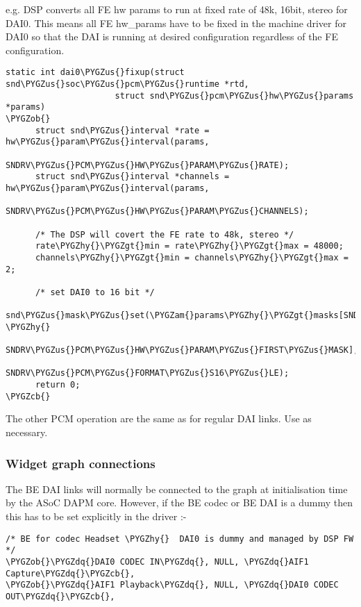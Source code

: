 \documentclass[a4paper,8pt,english]{sphinxmanual}
\def\PYGZus{\char`\_}
\def\PYGZob{\char`\{}
\def\PYGZcb{\char`\}}
\def\PYGZam{\char`\&}
\def\PYGZgt{\char`\>}
\def\PYGZhy{\char`\-}
\def\PYGZdq{\char`\"}
\begin{document}
e.g. DSP converts all FE hw params to run at fixed rate of 48k, 16bit, stereo for
DAI0. This means all FE hw\_params have to be fixed in the machine driver for
DAI0 so that the DAI is running at desired configuration regardless of the FE
configuration.

\begin{Verbatim}[commandchars=\\\{\}]
static int dai0\PYGZus{}fixup(struct snd\PYGZus{}soc\PYGZus{}pcm\PYGZus{}runtime *rtd,
                      struct snd\PYGZus{}pcm\PYGZus{}hw\PYGZus{}params *params)
\PYGZob{}
      struct snd\PYGZus{}interval *rate = hw\PYGZus{}param\PYGZus{}interval(params,
                      SNDRV\PYGZus{}PCM\PYGZus{}HW\PYGZus{}PARAM\PYGZus{}RATE);
      struct snd\PYGZus{}interval *channels = hw\PYGZus{}param\PYGZus{}interval(params,
                                              SNDRV\PYGZus{}PCM\PYGZus{}HW\PYGZus{}PARAM\PYGZus{}CHANNELS);

      /* The DSP will covert the FE rate to 48k, stereo */
      rate\PYGZhy{}\PYGZgt{}min = rate\PYGZhy{}\PYGZgt{}max = 48000;
      channels\PYGZhy{}\PYGZgt{}min = channels\PYGZhy{}\PYGZgt{}max = 2;

      /* set DAI0 to 16 bit */
      snd\PYGZus{}mask\PYGZus{}set(\PYGZam{}params\PYGZhy{}\PYGZgt{}masks[SNDRV\PYGZus{}PCM\PYGZus{}HW\PYGZus{}PARAM\PYGZus{}FORMAT \PYGZhy{}
                                  SNDRV\PYGZus{}PCM\PYGZus{}HW\PYGZus{}PARAM\PYGZus{}FIRST\PYGZus{}MASK],
                                  SNDRV\PYGZus{}PCM\PYGZus{}FORMAT\PYGZus{}S16\PYGZus{}LE);
      return 0;
\PYGZcb{}
\end{Verbatim}

The other PCM operation are the same as for regular DAI links. Use as necessary.


\subsubsection{Widget graph connections}
\label{sound/soc/dpcm:widget-graph-connections}
The BE DAI links will normally be connected to the graph at initialisation time
by the ASoC DAPM core. However, if the BE codec or BE DAI is a dummy then this
has to be set explicitly in the driver :-

\begin{Verbatim}[commandchars=\\\{\}]
/* BE for codec Headset \PYGZhy{}  DAI0 is dummy and managed by DSP FW */
\PYGZob{}\PYGZdq{}DAI0 CODEC IN\PYGZdq{}, NULL, \PYGZdq{}AIF1 Capture\PYGZdq{}\PYGZcb{},
\PYGZob{}\PYGZdq{}AIF1 Playback\PYGZdq{}, NULL, \PYGZdq{}DAI0 CODEC OUT\PYGZdq{}\PYGZcb{},
\end{Verbatim}
\end{document}
